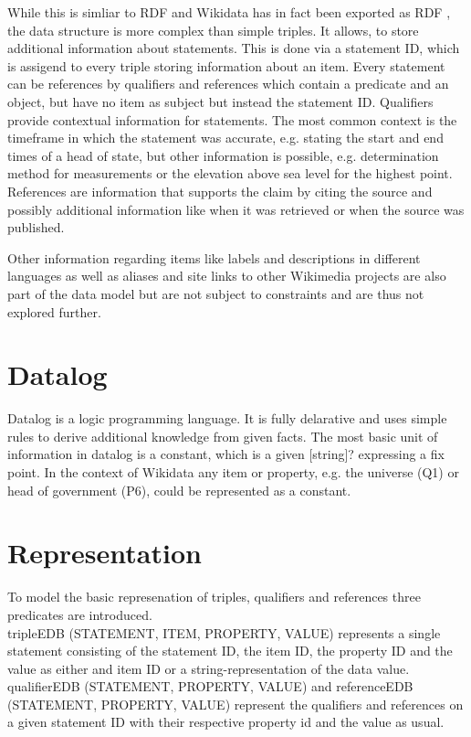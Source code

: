 \documentclass[hyperref,bachelorofscience]{cgvpub}
\begin{document}
While this is simliar to RDF and Wikidata has in fact been exported as RDF \cite{EGKMV2014}, the data structure is more complex than simple triples. It allows, to store additional information about statements. This is done via a statement ID, which is assigend to every triple storing information about an item. Every statement can be references by qualifiers and references which contain a predicate and an object, but have no item as subject but instead the statement ID. Qualifiers provide contextual information for statements. The most common context is the timeframe in which the statement was accurate, e.g. stating the start and end times of a head of state, but other information is possible, e.g. determination method for measurements or the elevation above sea level for the highest point. References are information that supports the claim by citing the source and possibly additional information like when it was retrieved or when the source was published.

Other information regarding items like labels and descriptions in different languages as well as aliases and site links to other Wikimedia projects are also part of the data model but are not subject to constraints and are thus not explored further.
\section{Datalog}
Datalog is a logic programming language. It is fully delarative and uses simple rules to derive additional knowledge from given facts. The most basic unit of information in datalog is a constant, which is a given [string]? expressing a fix point. In the context of Wikidata any item or property, e.g. the universe (Q1) or head of government (P6), could be represented as a constant.
\section{Representation}
To model the basic represenation of triples, qualifiers and references three predicates are introduced.\\
tripleEDB (STATEMENT, ITEM, PROPERTY, VALUE) represents a single statement consisting of the statement ID, the item ID, the property ID and the value as either and item ID or a string-representation of the data value.\\
qualifierEDB (STATEMENT, PROPERTY, VALUE) and referenceEDB (STATEMENT, PROPERTY, VALUE) represent the qualifiers and references on a given statement ID with their respective property id and the value as usual.\\
\end{document}
